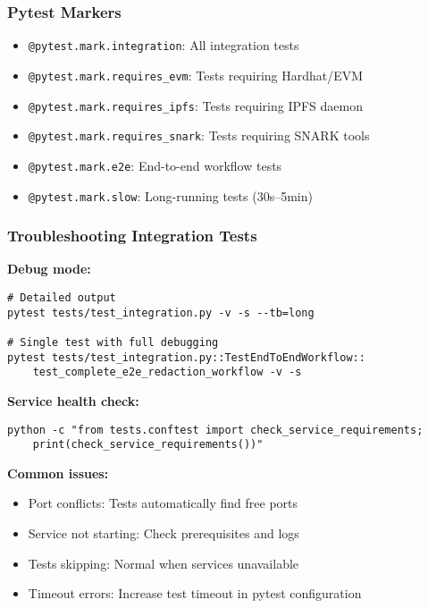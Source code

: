 \subsubsection{Pytest Markers}

\begin{itemize}
    \item \texttt{@pytest.mark.integration}: All integration tests
    \item \texttt{@pytest.mark.requires\_evm}: Tests requiring Hardhat/EVM
    \item \texttt{@pytest.mark.requires\_ipfs}: Tests requiring IPFS daemon
    \item \texttt{@pytest.mark.requires\_snark}: Tests requiring SNARK tools
    \item \texttt{@pytest.mark.e2e}: End-to-end workflow tests
    \item \texttt{@pytest.mark.slow}: Long-running tests (30s--5min)
\end{itemize}

\subsubsection{Troubleshooting Integration Tests}

\textbf{Debug mode:}
\begin{verbatim}
# Detailed output
pytest tests/test_integration.py -v -s --tb=long

# Single test with full debugging
pytest tests/test_integration.py::TestEndToEndWorkflow::
    test_complete_e2e_redaction_workflow -v -s
\end{verbatim}

\textbf{Service health check:}
\begin{verbatim}
python -c "from tests.conftest import check_service_requirements; 
    print(check_service_requirements())"
\end{verbatim}

\textbf{Common issues:}
\begin{itemize}
    \item Port conflicts: Tests automatically find free ports
    \item Service not starting: Check prerequisites and logs
    \item Tests skipping: Normal when services unavailable
    \item Timeout errors: Increase test timeout in pytest configuration
\end{itemize}


